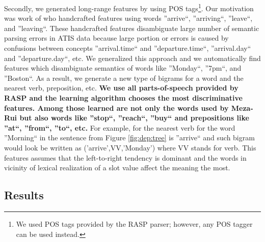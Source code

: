 \documentclass{article}
\begin{document}
Secondly, we generated long-range features by using POS tags\footnote{We used POS tags provided by the RASP parser; however, any POS tagger can be used instead.}. 
Our motivation was work of \cite{meza08a,meza08b} who handcrafted features using words ''arrive``, ''arriving``, ''leave``, and ''leaving``. These handcrafted features disambiguate large number of semantic parsing errors in ATIS data because large portion or errors is caused by confusions between concepts ''arrival.time`` and ''departure.time``, ''arrival.day`` and ''departure.day``, etc. We generalized this approach and we automatically find features which  disambiguate semantics of words like ''Monday``, ''7pm``, and ''Boston``. As a result, we generate a new type of bigrams for a word and the nearest verb, preposition, etc. \textbf{We use all parts-of-speech provided by RASP and the learning algorithm chooses the most discriminative features. Among those learned are not only the words used by Meza-Rui but also words like ''stop``, ''reach``, ''buy`` and prepositions like ''at``, ''from``, ''to``, etc.} For example, for the nearest verb for the word ''Morning`` in the sentence from Figure \ref{fig:dep:tree} is ''arrive`` and such bigram would look be written as ('arrive',VV,'Monday') where VV stands for verb. This features assumes that the left-to-right tendency is dominant and the words in vicinity of lexical realization of a slot value affect the meaning the most.

\subsection{Results}
\end{document}
